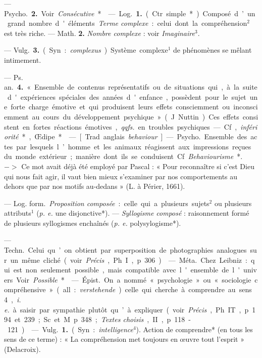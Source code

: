 \begin{itemize}[leftmargin=1cm, label=, itemsep=11pt]
— \si{Psycho.} {\bf 2.} Voir {\it Consécutive}*.

 — \si{Log.} {\bf 1.} (Ctr.
simple*). Composé d’un grand nombre d'éléments. {\it Terme complexe} :
celui dont la compréhension$^2$ est
très riche. — Math. {\bf 2.} {\it Nombre complexe} : voir {\it Imaginaire}$^3$.

 — \si{Vulg.} {\bf 3.} (Syn. :
{\it complexus}). Système complexe$^1$ de
phénomènes se mêlant intimement.

— \si{Ps. an.} {\bf 4.} « Ensemble de contenus représentatifs ou de situations qui, à la suite d'expériences
spéciales des années d'enfance, possèdent pour le sujet une forte charge
émotive et qui produisent leurs
effets consciemment ou inconsciemment au cours du développement
psychique » (J. Nuttin). Ces effets
consistent en fortes réactions émotives, {\it qqfs.} en troubles psychiques.
— Cf, {\it infériorité}*, Œdipe*.

 — [Trad. anglais {\it behaviour}] — \si{Psycho.} Ensemble des
actes par lesquels l’homme et les
animaux réagissent aux impressions
reçues du monde extérieur; manière
dont ils se conduisent. Cf. {\it Behaviourisme}*. $->$ Ce mot avait déjà
été employé par Pascal : « Pour
reconnaître si c'est Dieu qui nous
fait agir, il vaut bien mieux s’examiner par nos comportements au
dehors que par nos motifs au-dedans »
(L. à Périer, 1661).

 — \si{Log. form.} {\it Proposition
composée} : celle qui a plusieurs
sujets$^2$ ou plusieurs attributs$^1$ ({\it p. e.}
une disjonctive*). — {\it Syllogisme
composé} : raisonnement formé de
plusieurs syllogismes enchaînés ({\it p. e.}
polysylogisme*).

 — \si{Techn.} Celui
qu’on obtient par superposition
de photographies analogues sur
un même cliché (voir {\it Précis}, Ph. I,
p. 306).

 — \si{Méta.} Chez Leibniz :
qui est non seulement possible,
mais compatible avec l'ensemble de
l'univers. Voir {\it Possible}*.

 — \si{Épist.} On a nommé
« psychologie » ou « sociologie compréhensive » (all. : {\it verstehende}) celle
qui cherche à comprendre au sens 4,
{\it i. e.} à saisir par sympathie plutôt
qu’à expliquer (voir {\it Précis}, Ph. IT,
p. 194 et 239; Sc. et M. p. 348;
{\it Textes choisis}, II, p. 118-121).

 — \si{Vulg.} {\bf 1.} (Syn. :
{\it intelligence}$^4$). Action de comprendre*
(en tous les sens de ce terme) : « La
compréhension met toujours en
œuvre tout l'esprit » (Delacroix).


\end{itemize}
